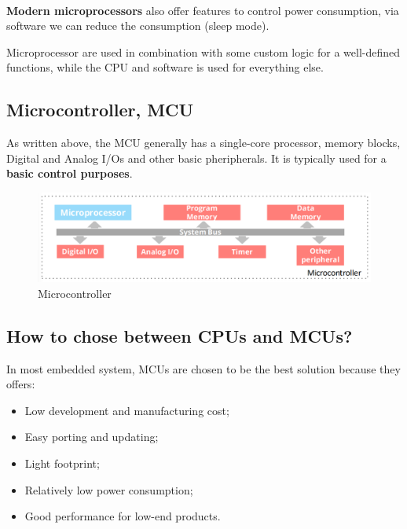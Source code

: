 \paragraph{}

\textbf{Modern microprocessors} also offer features to control power consumption, via software we can reduce the consumption (sleep mode).

Microprocessor are used in combination with some custom logic for a well-defined functions, while the CPU and software is used for everything else.


\subsection{Microcontroller, MCU}

As written above, the MCU generally has a single-core processor, memory blocks, Digital and Analog I/Os and other basic pheripherals. It is typically used for a \textbf{basic control purposes}.

\begin{figure}[H]
    \centering
    \includegraphics[width=0.8\linewidth]{img/img3.png}
    \caption{Microcontroller}
\end{figure}

\subsection{How to chose between CPUs and MCUs?}

In most embedded system, MCUs are chosen to be the best solution because they offers:

\begin{itemize}
    \item Low development and manufacturing cost;
    \item Easy porting and updating;
    \item Light footprint;
    \item Relatively low power consumption;
    \item Good performance for low-end products.
\end{itemize}

